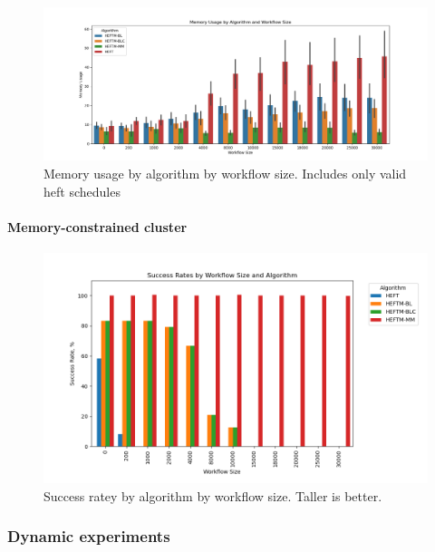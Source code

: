 \documentclass[conference]{IEEEtran}
\begin{document}
    \begin{figure}[tb]
        \centering
        \includegraphics[width=1.1\columnwidth] {images/mem-usage-normal-onlyvalid}
        \caption{Memory usage by algorithm by workflow size. Includes only valid heft schedules}
        \label{fig:mem-usages-onlyvalid}
        \vspace{-0.3cm}
    \end{figure}

    \paragraph{Memory-constrained cluster}

    \begin{figure}[tb]
        \centering
        \includegraphics[width=1.1\columnwidth] {images/success-rates-tiny}
        \caption{Success ratey by algorithm by workflow size. Taller is better. }
        \label{fig:success-rates-tiny}
        \vspace{-0.3cm}
    \end{figure}


    \subsubsection{Dynamic experiments}
\end{document}
